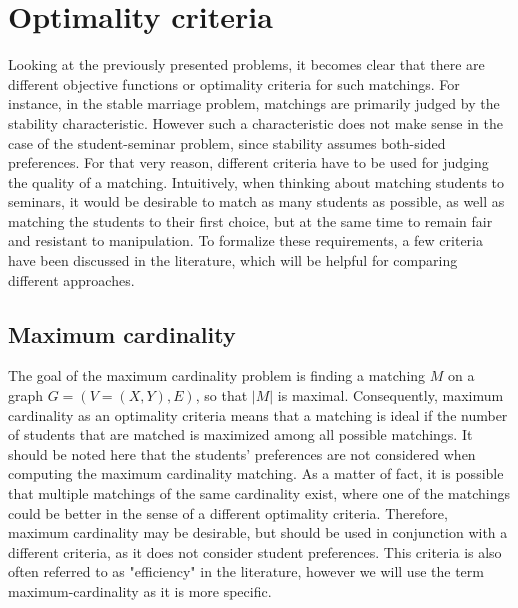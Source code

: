 \section{Optimality criteria}
Looking at the previously presented problems, it becomes clear that there are different objective functions or optimality criteria for such matchings. For instance, in the stable marriage problem, matchings are primarily judged by the stability characteristic. However such a characteristic does not make sense in the case of the student-seminar problem, since stability assumes both-sided preferences. For that very reason, different criteria have to be used for judging the quality of a matching.
\newline
Intuitively, when thinking about matching students to seminars, it would be desirable to match as many students as possible, as well as matching the students to their first choice, but at the same time to remain fair and resistant to manipulation. To formalize these requirements, a few criteria have been discussed in the literature, which will be helpful for comparing different approaches. 

\subsection{Maximum cardinality}
The goal of the maximum cardinality problem is finding a matching $M$ on a graph $G=(V=(X, Y), E)$, so that $|M|$ is maximal.\cite{GraphTheoryIntro} Consequently, maximum cardinality as an optimality criteria means that a matching is ideal if the number of students that are matched is maximized among all possible matchings. It should be noted here that the students' preferences are not considered when computing the maximum cardinality matching. As a matter of fact, it is possible that multiple matchings of the same cardinality exist, where one of the matchings could be better in the sense of a different optimality criteria. Therefore, maximum cardinality may be desirable, but should be used in conjunction with a different criteria, as it does not consider student preferences. This criteria is also often referred to as "efficiency" in the literature, however we will use the term maximum-cardinality as it is more specific.

